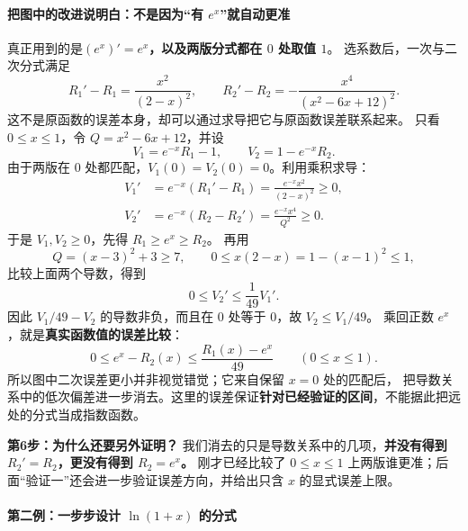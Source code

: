 \begin{proofbox}
\paragraph{把图中的改进说明白：不是因为“有 $e^x$”就自动更准}
真正用到的是\textbf{$(e^x)'=e^x$，以及两版分式都在 $0$ 处取值 $1$}。
选系数后，一次与二次分式满足
\[
 R_1'-R_1=\frac{x^2}{(2-x)^2},\qquad
 R_2'-R_2=-\frac{x^4}{(x^2-6x+12)^2}.
\]
这不是原函数的误差本身，却可以通过求导把它与原函数误差联系起来。
只看 $0\le x\le1$，令 $Q=x^2-6x+12$，并设
\[
 V_1=e^{-x}R_1-1,\qquad V_2=1-e^{-x}R_2.
\]
由于两版在 $0$ 处都匹配，$V_1(0)=V_2(0)=0$。利用乘积求导：
\[
 \begin{aligned}
 V_1'&=e^{-x}(R_1'-R_1)=\frac{e^{-x}x^2}{(2-x)^2}\ge0,\\
 V_2'&=e^{-x}(R_2-R_2')=\frac{e^{-x}x^4}{Q^2}\ge0.
 \end{aligned}
\]
于是 $V_1,V_2\ge0$，先得 $R_1\ge e^x\ge R_2$。
再用
\[
 Q=(x-3)^2+3\ge7,\qquad 0\le x(2-x)=1-(x-1)^2\le1,
\]
比较上面两个导数，得到
\[
 0\le V_2'\le\frac1{49}V_1'.
\]
因此 $V_1/49-V_2$ 的导数非负，而且在 $0$ 处等于 $0$，故 $V_2\le V_1/49$。
乘回正数 $e^x$，就是\textbf{真实函数值的误差比较}：
\[
 \boxed{\ 0\le e^x-R_2(x)\le\frac{R_1(x)-e^x}{49}
 \qquad(0\le x\le1).\ }
\]
所以图中二次误差更小并非视觉错觉；它来自保留 $x=0$ 处的匹配后，
把导数关系中的低次偏差进一步消去。这里的误差保证\textbf{针对已经验证的区间}，不能据此把远处的分式当成指数函数。

\textbf{第6步：为什么还要另外证明？}
我们消去的只是导数关系中的几项，\textbf{并没有得到 $R_2'=R_2$，更没有得到 $R_2=e^x$。}
刚才已经比较了 $0\le x\le1$ 上两版谁更准；后面“验证一”还会进一步验证误差方向，并给出只含 $x$ 的显式误差上限。

\medskip
\newpage
\paragraph{第二例：一步步设计 $\ln(1+x)$ 的分式}


\end{proofbox}
